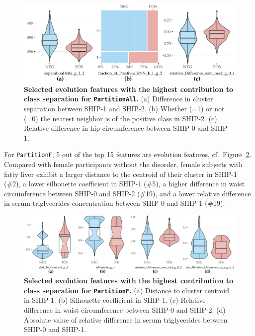 \documentclass[
  oneside]{book}
\begin{document}
\begin{figure}[htb]

{\centering \includegraphics[width=1\linewidth]{figures/06-imp-features-all} 

}

\caption{\textbf{Selected evolution features with the highest contribution to class separation for \texttt{PartitionAll}.} (a) Difference in cluster separation between SHIP-1 and SHIP-2. (b) Whether (=1) or not (=0) the nearest neighbor is of the positive class in SHIP-2. (c) Relative difference in hip circumference between SHIP-0 and SHIP-1.}\label{fig:06-imp-features-all}
\end{figure}

For \texttt{PartitionF}, 5 out of the top 15 features are evolution features, cf.~Figure~\ref{fig:06-imp-features-women}.
Compared with female participants without the disorder, female subjects with fatty liver exhibit a larger distance to the centroid of their cluster in SHIP-1 (\#2), a lower silhouette coefficient in SHIP-1 (\#5), a higher difference in waist circumference between SHIP-0 and SHIP-2 (\#19), and a lower relative difference in serum triglycerides concentration between SHIP-0 and SHIP-1 (\#19).



\begin{figure}[htb]

{\centering \includegraphics[width=1\linewidth]{figures/06-imp-features-women} 

}

\caption{\textbf{Selected evolution features with the highest contribution to class separation for \texttt{PartitionF}.} (a) Distance to cluster centroid in SHIP-1. (b) Silhouette coefficient in SHIP-1. (c) Relative difference in waist circumference between SHIP-0 and SHIP-2. (d) Absolute value of relative difference in serum triglycerides between SHIP-0 and SHIP-1.}\label{fig:06-imp-features-women}
\end{figure}
\end{document}
